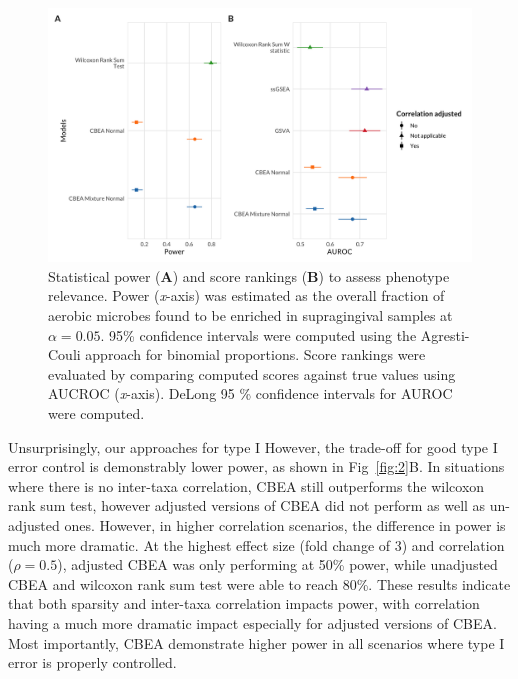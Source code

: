 \documentclass[10pt,letterpaper]{article}
\begin{document}
\begin{figure}[!h]
    \centering
    \includegraphics[width = \textwidth]{figures/data_ss_pwr_new.png}
    \caption{Statistical power (\textbf{A}) and score rankings (\textbf{B}) to assess phenotype relevance. Power (\emph{x}-axis) was estimated as the overall fraction of aerobic microbes found to be enriched in supragingival samples at $\alpha = 0.05$. 95\% confidence intervals were computed using the Agresti-Couli approach for binomial proportions. Score rankings were evaluated by comparing computed scores against true values using AUCROC (\emph{x}-axis). DeLong 95 \% confidence intervals for AUROC were computed.} 
    \label{fig:3}
\end{figure}

Unsurprisingly, our approaches for type I 
However, the trade-off for good type I error control is demonstrably lower power, as shown in Fig~\ref{fig:2}B. In situations where there is no inter-taxa correlation, CBEA still outperforms the wilcoxon rank sum test, however adjusted versions of CBEA did not perform as well as un-adjusted ones. However, in higher correlation scenarios, the difference in power is much more dramatic. At the highest effect size (fold change of 3) and correlation ($\rho = 0.5$), adjusted CBEA was only performing at 50\% power, while unadjusted CBEA and wilcoxon rank sum test were able to reach 80\%. These results indicate that both sparsity and inter-taxa correlation impacts power, with correlation having a much more dramatic impact especially for adjusted versions of CBEA. Most importantly, CBEA demonstrate higher power in all scenarios where type I error is properly controlled.    
\end{document}
